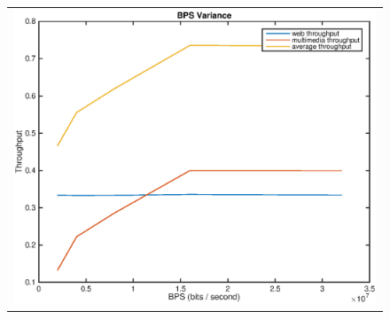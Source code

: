 \begin{figure}
\begin{tabular}{cc}
\multicolumn{2}{c}{\includegraphics[scale=0.35]{../../src/fig-simulation_web_multimedia-bps-1_5.000000e-01_1_5_12000.eps}}

\end{tabular}
\end{figure}
